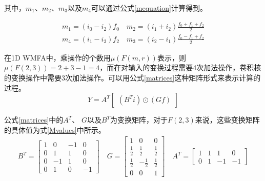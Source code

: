 其中，$m_1$、$m_2$、$m_3$以及$m_4$可以通过公式\ref{mequation}计算得到。

\begin{equation}
\label{mequation}
\begin{split}
m_1 = (i_0-i_2)f_0 	 \quad	m_2 = (i_1+i_2)\frac{f_0+f_1+f_2}{2} \\
m_4 = (i_1-i_3)f_2 	 \quad	m_3 = (i_2-i_1)\frac{f_0-f_1+f_2}{2}
\end{split}
\end{equation}

在1D WMFA中，乘操作的个数用$\mu(F(m,r))$表示，则$\mu(F(2,3))  = 2+3-1=4$，而在对输入的变换过程需要4次加法操作，卷积核的变换操作中需要3次加法操作。可以用公式\ref{matrices}这种矩阵形式来表示计算的过程。
\begin{equation} \label{matrices}
Y = A^T\begin{bmatrix}
(B^Ti)\odot{(Gf)}
\end{bmatrix}
\end{equation}

公式\ref{matrices}中的$A^T$、 $G$以及$B^T$为变换矩阵，对于$F(2,3)$来说，这些变换矩阵的具体值为式\ref{Mvalues}中所示。
\begin{equation} 
\label{Mvalues}
\begin{split}
B^T = \begin{bmatrix}
1 & 0 & -1 & 0 \\
0 & 1 & 1 & 0 \\
0 & -1 & 1 & 0 \\
0 & 1 & 0 & -1 
\end{bmatrix} \quad G = \begin{bmatrix}
1 & 0 & 0 \\
\frac{1}{2} & \frac{1}{2} & \frac{1}{2} \\
\frac{1}{2} & -\frac{1}{2} & \frac{1}{2} \\
0 & 0 & 1
\end{bmatrix} \quad A^T = \begin{bmatrix}
1 & 1 & 1 & 0 \\
0 & 1 &-1 & -1
\end{bmatrix} 
\end{split}
\end{equation}

